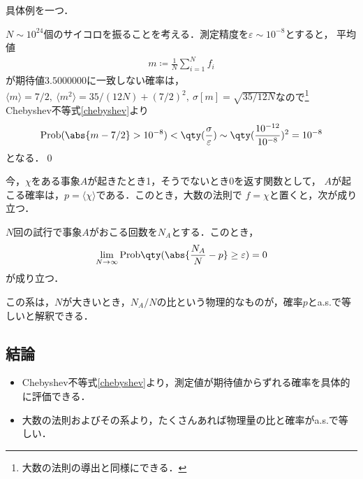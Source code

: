   具体例を一つ．
  \begin{eg}
    $N\sim10^{24}$個のサイコロを振ることを考える．測定精度を$\varepsilon\sim10^{-8}$とすると，
    平均値
    \begin{align}
      m\coloneqq \frac{1}{N}\sum_{i=1}^{N}f_i
    \end{align}
    が期待値$3.5000000$に一致しない確率は，$\langle m \rangle = 7/2,\ \langle m^2 \rangle = 35 / (12 N) + (7/2)^2,\ \sigma[m] = \sqrt{35/12N}$なので\footnote{大数の法則の導出と同様にできる．}
    Chebyshev不等式\eqref{chebyshev}より
    \begin{align}
      \mathrm{Prob}(\abs{m-7/2} > 10^{-8}) < \qty(\frac{\sigma}{\varepsilon})\sim \qty(\frac{10^{-12}}{10^{-8}})^{2}= 10^{-8}
    \end{align}
    となる．\qed
  \end{eg}
  今，$\chi$をある事象$A$が起きたとき1，そうでないとき0を返す関数として，
  $A$が起こる確率は，$p = \langle \chi \rangle$である．このとき，大数の法則で
  $f=\chi$と置くと，次が成り立つ．
  \begin{cor}
    $N$回の試行で事象$A$がおこる回数を$N_A$とする．このとき，
    \begin{align}
      \lim_{N\to\infty}\mathrm{Prob}\qty(\abs{\frac{N_A}{N}-p}\geq \varepsilon ) = 0  
    \end{align}
    が成り立つ．
  \end{cor}
  この系は，$N$が大きいとき，$N_A/N$の比という物理的なものが，確率$p$とa.s.で等しいと解釈できる．
\subsection{結論}
  \begin{itemize}
    \item Chebyshev不等式\eqref{chebyshev}より，測定値が期待値からずれる確率を具体的に評価できる．
    \item 大数の法則およびその系より，たくさんあれば物理量の比と確率がa.s.で等しい．
  \end{itemize}
